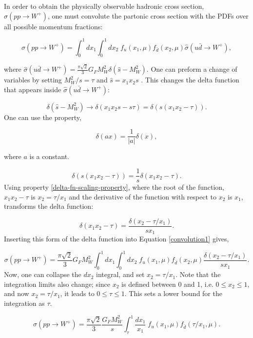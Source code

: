 \documentclass[a4paper,11pt]{article}
\begin{document}
In order to obtain the physically observable hadronic cross section, $\sigma(pp\rightarrow W^+)$, one must convolute the partonic cross section with the PDFs over all possible momentum fractions:

\begin{equation}\label{convolution1}
	\sigma(pp \rightarrow W^+) = \int_0^1 dx_1 \int_0^1 dx_2\; f_u(x_1, \mu)f_{\bar{d}}(x_2,\mu) \hat{\sigma}(u \bar{d} \rightarrow W^+),
\end{equation}


where $\hat{\sigma}(u \bar{d} \rightarrow W^+) =\frac{\pi \sqrt{2}}{3}G_FM^2_W\delta(\hat{s} - M_W^2)$. One can preform a change of variables by setting $M_W^2/s = \tau$ and $\hat{s}= x_1x_2s$ \cite{Ellis:1990pp}. This changes the delta function that appears inside $\hat{\sigma}(u \bar{d} \rightarrow W^+)$:

$$
\delta(\hat{s} - M_W^2) \rightarrow \delta(x_1x_2s - s\tau) = \delta(s(x_1x_2  - \tau)). 
$$
One can use the property,

\begin{equation}\label{simple-scaling}
	\delta(ax) = \frac{1}{|a|}\delta(x),
\end{equation}


where $a$ is a constant. 

$$
\delta(s(x_1x_2  - \tau)) = \frac{1}{s}\delta(x_1x_2 - \tau).
$$
Using property \ref{delta-fn-scaling-property}, where the root of the function, $x_1x_2 - \tau$ is $x_2 = \tau /x_1$ and the derivative of the function with respect to $x_2$ is $x_1$, transforms the delta function:

$$
\delta(x_1x_2 - \tau) = \frac{\delta(x_2 - \tau/x_1)}{sx_1}.
$$
Inserting this form of the delta function into Equation \ref{convolution1} gives,

$$
\sigma(pp \rightarrow W^+) = \frac{\pi \sqrt{2}}{3}G_FM^2_W \int_0^1 dx_1 \int_0^1 dx_2\; f_u(x_1, \mu)f_{\bar{d}}(x_2,\mu) \frac{\delta(x_2 - \tau/x_1)}{sx_1}. 
$$
Now, one can collapse the $dx_2$ integral, and set $x_2 = \tau/x_1$. Note that the integration limits also change; since $x_2$ is defined between 0 and 1, i.e. $0 \leq x_2 \leq 1$,  and now $x_2 = \tau/x_1$, it leads to $0 \leq \tau \leq 1$. This sets a lower bound for the integration as $\tau$.

\begin{equation}\label{convolution-final}
	\sigma(pp \rightarrow W^+) = \frac{\pi \sqrt{2}}{3}\frac{G_FM^2_W}{s} \int_\tau^1 \frac{dx_1}{x_1}\;  f_u(x_1, \mu)f_{\bar{d}}(\tau/x_1,\mu).	
\end{equation}
\end{document}
